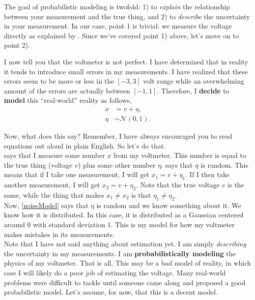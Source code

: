 \documentclass[10pt,letterpaper]{article}
\begin{document}
The goal of probabilistic modeling is twofold: 1) to \emph{explain} the relationship between your measurement and the true thing, and 2) to \emph{describe} the uncertainty in your measurement. In our case, point 1 is trivial: we measure the voltage directly as explained by . Since we've covered point 1) above, let's move on to point 2).

I now tell you that the voltmeter is not perfect. I have determined that in reality it tends to introduce small errors in my measurements. I have realized that these errors seem to be more or less in the $[-3, 3]$ volt range while an overwhelming amount of the errors are actually between $[-1, 1]$. Therefore, I \textbf{decide} to \textbf{model} this ``real-world'' reality as follows,
\begin{align}
	x &= v + \eta, \label{measurementModel}\\
	\eta &\sim \mathcal{N}(0,1)\label{noiseModel}.
\end{align}

Now, what does this say? Remember, I have always encouraged you to read equations out aloud in plain English. So let's do that. \\

 says that I measure some number $x$ from my voltmeter. This number is equal to the true thing (voltage $v$) plus some other number $\eta$.  says that $\eta$ is random. This means that if I take one measurement, I will get $x_1 = v + \eta_1$. If I then take another measurement, I will get $x_2 = v + \eta_2$. Note that the true voltage $v$ is the same, while the thing that makes $x_1 \neq x_2$ is that $\eta_1 \neq \eta_2$. \\

Now, \cref{noiseModel} says that $\eta$ is random and we know something about it. We know how it is distributed. In this case, it is distributed as a Gaussian centered around $0$ with standard deviation $1$. This is my model for how my voltmeter makes mistakes in its measurements. \\

Note that I have not said anything about estimation yet. I am simply \emph{describing} the uncertainty in my measurements. I am \textbf{probabilistically modeling} the physics of my voltmeter. That is all. This may be a bad model of reality, in which case I will likely do a poor job of estimating the voltage. Many real-world problems were difficult to tackle until someone came along and proposed a good probabilistic model. Let's assume, for now, that this is a decent model.\\
\end{document}
